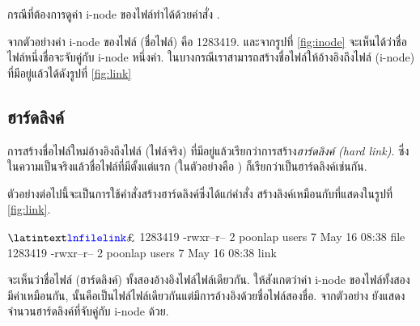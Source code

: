 \begin{thwbr}
\begin{figure}[!htb]
\end{figure}

กรณีที่ต้องการดูค่า i-node ของไฟล์ทำได้ด้วยคำสั่ง .
\begin{MyExample}
\end{MyExample}%
จากตัวอย่างค่า i-node ของไฟล์  (ชื่อไฟล์) คือ 1283419. และจากรูปที่ \ref{fig:inode} จะเห็นได้ว่าชื่อไฟล์หนึ่งชื่อจะจับคู่กับ i-node หนึ่งค่า. ในบางกรณีเราสามารถสร้างชื่อไฟล์ให้อ้างอิงถึงไฟล์ (i-node) ที่มีอยู่แล้วได้ดังรูปที่ \ref{fig:link}

\begin{figure}[!htb]
\end{figure}
 
\subsection{ฮาร์ดลิงค์}
การสร้างชื่อไฟล์ใหม่อ้างอิงถึงไฟล์ (ไฟล์จริง) ที่มีอยู่แล้วเรียกว่าการสร้าง\emph{ฮาร์ดลิงค์ (hard link)}. ซึ่งในความเป็นจริงแล้วชื่อไฟล์ที่มีตั้งแต่แรก (ในตัวอย่างคือ ) ก็เรียกว่าเป็นฮาร์ดลิงค์เช่นกัน. 

ตัวอย่างต่อไปนี้จะเป็นการใช้คำสั่งสร้างฮาร์ดลิงค์ซึ่งได้แก่คำสั่ง   สร้างลิงค์เหมือนกับที่แสดงในรูปที่ \ref{fig:link}.\\
\begin{MyExample}
\begin{MyEx}
$ 
$ 
1283419 -rwxr--r--    2 poonlap  users           7 May 16 08:38 file
1283419 -rwxr--r--    2 poonlap  users           7 May 16 08:38 link
                      \arrowup {}
\end{MyEx}
\end{MyExample}
จะเห็นว่าชื่อไฟล์ (ฮาร์ดลิงค์) ทั้งสองอ้างอิงไฟล์ไฟล์เดียวกัน. ให้สังเกตว่าค่า i-node ของไฟล์ทั้งสองมีค่าเหมือนกัน, นั้นคือเป็นไฟล์ไฟล์เดียวกันแต่มีการอ้างอิงด้วยชื่อไฟล์สองชื่อ. จากตัวอย่าง  ยังแสดงจำนวนฮาร์ดลิงค์ที่จับคู่กับ i-node ด้วย.


\end{thwbr}
